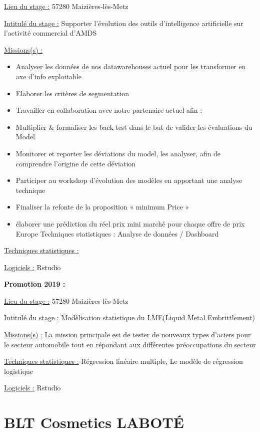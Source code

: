 \documentclass[
  letterpaper,
  DIV=11,
  numbers=noendperiod]{scrreprt}
\begin{document}
\uline{Lieu du stage :} 57280 Maizières-lès-Metz

\uline{Intitulé du stage :} Supporter l'évolution des outils
d'intelligence artificielle sur l'activité commercial d'AMDS

\uline{Missions(s) :}

\begin{itemize}
\item
  Analyser les données de nos datawarehouses actuel pour les transformer
  en axe d'info exploitable
\item
  Elaborer les critères de segmentation
\item
  Travailler en collaboration avec notre partenaire actuel afin :
\item
  Multiplier \& formaliser les back test dans le but de valider les
  évaluations du Model
\item
  Monitorer et reporter les déviations du model, les analyser, afin de
  comprendre l'origine de cette déviation
\item
  Participer au workshop d'évolution des modèles en apportant une
  analyse technique
\item
  Finaliser la refonte de la proposition « minimum Price »
\item
  élaborer une prédiction du réel prix mini marché pour chaque offre de
  prix Europe Techniques statistiques : Analyse de données / Dashboard
\end{itemize}

\uline{Techniques statistiques :}

\uline{Logiciels :} Rstudio

\textbf{Promotion 2019 :}

\uline{Lieu du stage :} 57280 Maizières-lès-Metz

\uline{Intitulé du stage :} Modèlisation statistique du LME(Liquid Metal
Embrittlement)

\uline{Missions(s) :} La mission principale est de tester de nouveaux
types d'aciers pour le secteur automobile tout en répondant aux
différentes préoccupations du secteur

\uline{Techniques statistiques :} Régression linéaire multiple, Le
modèle de régression logistique

\uline{Logiciels :} Rstudio

\hypertarget{blt-cosmetics-labotuxe9}{%
\section{\texorpdfstring{\textbf{BLT Cosmetics
LABOTÉ}}{BLT Cosmetics LABOTÉ}}\label{blt-cosmetics-labotuxe9}}
\end{document}
